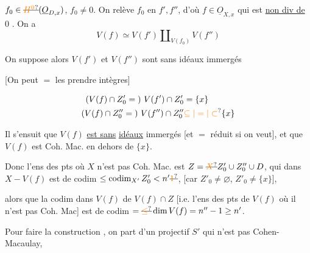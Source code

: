$f_0\in\deleted{\unsure{H^0}}(\underline O_{D,x})$, $f_0\ne0$. On relève $f_0$ en $f',f''$, d'où $f\in\underline O_{X,x}$  qui est \uline{non div de $0$} . On a
\[
 V(f)\simeq V(f')\amalg_{V(f_0)}V(f'')
\]

On suppose alors $V(f')$ et $V(f'')$ sont sans idéaux immergés


[On peut $=$ les prendre intègres]

\[
\begin{aligned}
(V(f)\cap Z'_0={})\ V(f')\cap Z'_0&=\{x\}\\
(V(f)\cap Z''_0={})\ V(f'')\cap Z''_0&\unsure{\subseteq|=|\subset}\{x\}
\end{aligned}
\]

Il s'ensuit que $V(f)$ \uline{est sans} \uline{idéaux} immergés [et $=$ réduit si on veut], et que $V(f)$ est Coh. Mac. en dehors de $\{x\}$.


 Donc l'ens des pts où $X$ n'est pas Coh. Mac. est $Z=\deleted{\unsure{X}}Z'_0\cup Z''_0\cup D$, qui dans $X-V(f)$ est de codim $\leq\operatorname{codim}_{X'}Z'_0<n'\deleted{\unsure{1}}$, [car $Z'_0\ne\varnothing$, $Z'_0\ne\{x\}$], 

alors que la codim dans $V(f)$ de $V(f)\cap Z$ [i.e. l'ens des pts de $V(f)$ où  il n'est pas Coh. Mac] est de codim $=\deleted{\unsure{\leq}}\dim V(f)=n''-1\geq n'$.

Pour faire la construction , on part d'un   projectif  $S'$   qui n'est pas Cohen-Macaulay, \deleted{\unsure{tel qu'on} \unsure{appart} [l'un des} 

